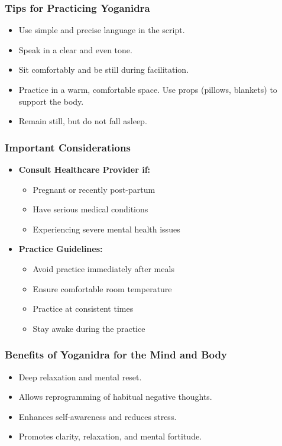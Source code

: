 \begin{frame}[fragile]\frametitle{Tips for Practicing Yoganidra}
    \begin{itemize}
        \item Use simple and precise language in the script.
        \item Speak in a clear and even tone.
        \item Sit comfortably and be still during facilitation.
        \item Practice in a warm, comfortable space. Use props (pillows, blankets) to support the body.
        \item Remain still, but do not fall asleep.
    \end{itemize}
\end{frame}

\begin{frame}[fragile]\frametitle{Important Considerations}
    \begin{itemize}
        \item \textbf{Consult Healthcare Provider if:}
        \begin{itemize}
            \item Pregnant or recently post-partum
            \item Have serious medical conditions
            \item Experiencing severe mental health issues
        \end{itemize}
        \item \textbf{Practice Guidelines:}
        \begin{itemize}
            \item Avoid practice immediately after meals
            \item Ensure comfortable room temperature
            \item Practice at consistent times
            \item Stay awake during the practice
        \end{itemize}
    \end{itemize}
\end{frame}

\begin{frame}[fragile]\frametitle{Benefits of Yoganidra for the Mind and Body}
    \begin{itemize}
        \item Deep relaxation and mental reset.
        \item Allows reprogramming of habitual negative thoughts.
        \item Enhances self-awareness and reduces stress.
        \item Promotes clarity, relaxation, and mental fortitude.
    \end{itemize}
\end{frame}

